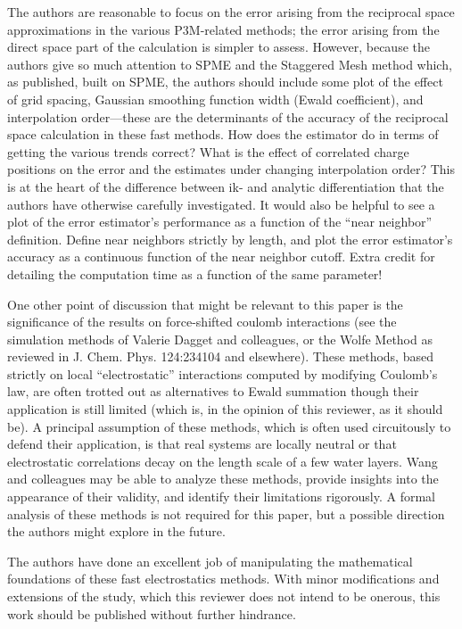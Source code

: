 \documentclass[a4paper]{article}
\begin{document}
The authors are reasonable to focus on the error arising from the reciprocal space approximations in the various P3M-related methods; the error arising from the direct space part of the calculation is simpler to assess.  However, because the authors give so much attention to SPME and the Staggered Mesh method which, as published, built on SPME, the authors should include some plot of the effect of grid spacing, Gaussian smoothing function width (Ewald coefficient), and interpolation order—these are the determinants of the accuracy of the reciprocal space calculation in these fast methods.  How does the estimator do in terms of getting the various trends correct?  What is the effect of correlated charge positions on the error and the estimates under changing interpolation order?  This is at the heart of the difference between ik- and analytic differentiation that the authors have otherwise carefully investigated.  It would also be helpful to see a plot of the error estimator’s performance as a function of the “near neighbor” definition.  Define near neighbors strictly by length, and plot the error estimator's accuracy as a continuous function of the near neighbor cutoff.  Extra credit for detailing the computation time as a function of the same parameter!

One other point of discussion that might be relevant to this paper is the significance of the results on force-shifted coulomb interactions (see the simulation methods of Valerie Dagget and colleagues, or the Wolfe Method as reviewed in J. Chem. Phys. 124:234104 and elsewhere).  These methods, based strictly on local “electrostatic” interactions computed by modifying Coulomb’s law, are often trotted out as alternatives to Ewald summation though their application is still limited (which is, in the opinion of this reviewer, as it should be).  A principal assumption of these methods, which is often used circuitously to defend their application, is that real systems are locally neutral or that electrostatic correlations decay on the length scale of a few water layers.  Wang and colleagues may be able to analyze these methods, provide insights into the appearance of their validity, and identify their limitations rigorously.  A formal analysis of these methods is not required for this paper, but a possible direction the authors might explore in the future.

The authors have done an excellent job of manipulating the mathematical foundations of these fast electrostatics methods.  With minor modifications and extensions of the study, which this reviewer does not intend to be onerous, this work should be published without further hindrance.
\end{document}

